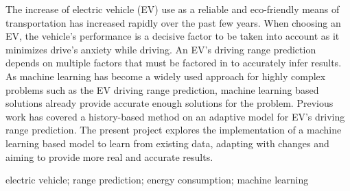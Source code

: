 \abstractEN %



The increase of electric vehicle (EV) use as a reliable
and eco-friendly means of transportation has increased
rapidly over the past few years.
When choosing an EV, the vehicle's performance is a 
decisive factor to be taken into account as it
 minimizes drive's anxiety while driving.
An EV's driving range prediction depends on multiple
factors that must be factored in to accurately infer results.
As machine learning has become a widely used approach
for highly complex problems such as the EV driving range
prediction, machine learning based solutions already
provide accurate enough solutions for the problem.
Previous work has covered a history-based method on an 
adaptive model for EV's driving range prediction.
The present project explores the implementation of
a machine learning based model to learn from existing data,
adapting with changes and aiming to provide more real 
and accurate results.


%
%
%
%
%
%
%
%

\begin{keywords}
    electric vehicle;
    range prediction;
    energy consumption;
    machine learning
\end{keywords} 
